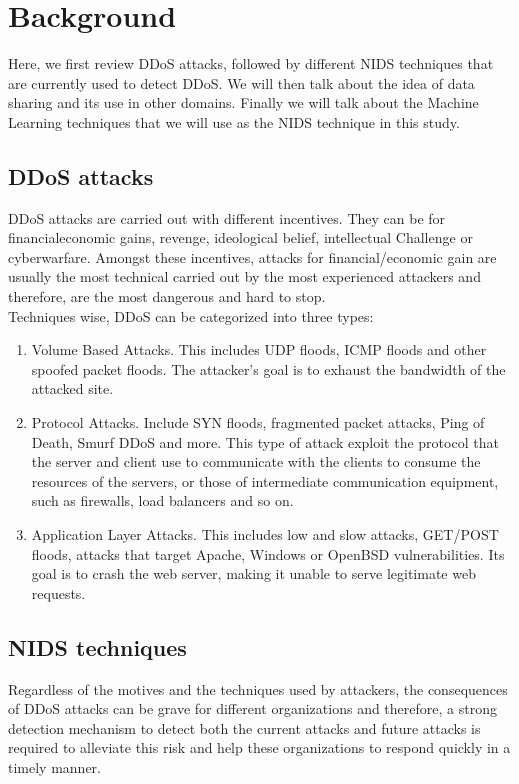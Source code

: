 \section{Background}
\label{sec:background}
\begin{background}
Here, we first review DDoS attacks, followed by different NIDS techniques that are currently used to detect DDoS. We will then talk about the idea of data sharing and its use in other domains. Finally we will talk about the Machine Learning techniques that we will use as the NIDS technique in this study.
\subsection{DDoS attacks}
DDoS attacks are carried out with different incentives. They can be for financial\/economic gains, revenge, ideological belief, intellectual Challenge or cyberwarfare. Amongst these incentives, attacks for financial/economic gain are usually the most technical carried out by the most experienced attackers and therefore, are the most dangerous and hard to stop.\\
Techniques wise, DDoS can be categorized into three types:
\begin{enumerate}
    \item Volume Based Attacks. This includes UDP floods, ICMP floods and other spoofed packet floods. The attacker's goal is to exhaust the bandwidth of the attacked site.
    \item Protocol Attacks. Include SYN floods, fragmented packet attacks, Ping of Death, Smurf DDoS and more. This type of attack exploit the protocol that the server and client use to communicate with the clients to consume the resources of the servers, or those of intermediate communication equipment, such as firewalls, load balancers and so on.
    \item Application Layer Attacks. This includes low and slow attacks, GET/POST floods, attacks that target Apache, Windows or OpenBSD vulnerabilities. Its goal is to crash the web server, making it unable to serve legitimate web requests.
\end{enumerate}


\subsection{NIDS techniques}
Regardless of the motives and the techniques used by attackers, the consequences of DDoS attacks can be grave for different organizations and therefore, a strong detection mechanism to detect both the current attacks and future attacks is required to alleviate this risk and help these organizations to respond quickly in a timely manner. 


\end{background}
